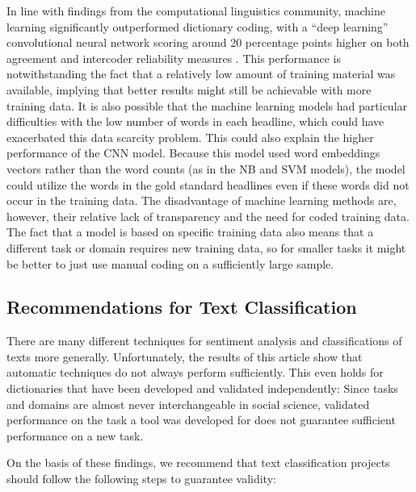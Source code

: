 In line with findings from the computational linguistics community, machine learning significantly outperformed dictionary coding,
with a ``deep learning'' convolutional neural network 
scoring around 20 percentage points higher on both agreement and intercoder reliability measures \citep{rudkowsky2018more,semeval,liu12}. 
This performance is notwithstanding the fact that a relatively low amount of training material was available, 
implying that better results might still be achievable with more training data.
It is also possible that the machine learning models had particular difficulties with the low number of words in each headline,
which could have exacerbated this data scarcity problem. 
This could also explain the higher performance of the CNN model. 
Because this model used word embeddings vectors rather than the word counts (as in the NB and SVM models),
the model could utilize the words in the gold standard headlines even if these words did not occur in the training data.
The disadvantage of machine learning methods are, however, their relative lack of transparency and the need for coded training data.
The fact that a model is based on specific training data also means that a different task or domain requires new training data,
so for smaller tasks it might be better to just use manual coding on a sufficiently large sample. 

\subsection*{Recommendations for Text Classification}
\noindent There are many different techniques for sentiment analysis and classifications of texts more generally. 
Unfortunately, the results of this article show that automatic techniques do not always perform sufficiently.
This even holds for dictionaries that have been developed and validated independently: 
Since tasks and domains are almost never interchangeable in social science, 
validated performance on the task a tool was developed for does not guarantee sufficient performance on a new task.

On the basis of these findings, we recommend that text classification projects should follow the following steps to guarantee validity:

